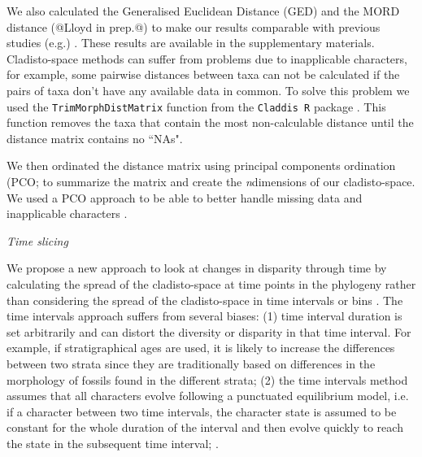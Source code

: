 \documentclass[12pt,letterpaper]{article}
\renewcommand{\subsection}[1]{%
\bigskip
\begin{center}
\begin{large}
\normalfont\itshape #1
\end{large}
\end{center}}
\begin{document}
We also calculated the Generalised Euclidean Distance (GED) \citep{Wills2001} and the MORD distance (@Lloyd in prep.@) to make our results comparable with previous studies (e.g.) 
. These results are available in the supplementary materials. %
Cladisto-space methods can suffer from problems due to inapplicable characters, for example, some pairwise distances between taxa can not be calculated if the pairs of taxa don't have any available data in common. To solve this problem we used the \texttt{TrimMorphDistMatrix} function from the \texttt{Claddis R} package \citep{Claddis}. This function removes the taxa that contain the most non-calculable distance until the distance matrix contains no ``NAs". 

We then ordinated the distance matrix using principal components ordination
(PCO; \citep{GOWER01121966} to summarize the matrix and create the \textit{n}dimensions of our cladisto-space. We used a PCO approach to be able to better handle missing data and inapplicable characters \citep{lofgren2003,Wesley-Hunt2005}.

\subsection{Time slicing} %
We propose a new approach to look at changes in disparity
through time by calculating the spread of the cladisto-space at time points in the phylogeny rather than considering the spread of the cladisto-space in time intervals or bins \citep[e.g.][]{Brusatte12092008,brusattedinosaur2012,toljagictriassic-jurassic2013}. The time intervals approach suffers from several biases: (1) time interval duration is set arbitrarily and can distort the diversity or disparity in that time interval. For example, if stratigraphical ages are used, it is likely to increase the differences between two strata since they are traditionally based on differences in the morphology of fossils found in the different strata; (2) the time intervals method assumes that all characters evolve following a punctuated equilibrium model, i.e. if a character 
between two time intervals, the character state is assumed to be constant for the whole duration of the interval and then evolve quickly to reach the state in the subsequent time interval; \citep{Gould1977}. %
\end{document}
